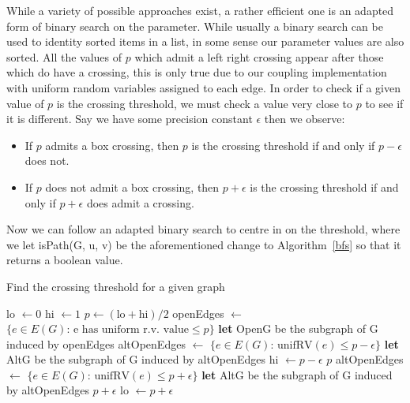 \documentclass[a4paper,11pt]{article}
\theoremstyle{definition}
\begin{document}
While a variety of possible approaches exist, a rather efficient one is an adapted form of binary search on the parameter. While usually a binary search can be used to identity sorted items in a list, in some sense our parameter values are also sorted. All the values of $p$ which admit a left right crossing appear after those which do have a crossing, this is only true due to our coupling implementation with uniform random variables assigned to each edge.
In order to check if a given value of $p$ is the crossing threshold, we must check a value very close to $p$ to see if it is different. Say we have some precision constant $\epsilon$ then we observe:
\begin{itemize}
	\item If $p$ admits a box crossing, then $p$ is the crossing threshold if and only if $p-\epsilon$ does not.
	\item If $p$ does not admit a box crossing, then $p+\epsilon$ is the crossing threshold if and only if $p+\epsilon$ does admit a crossing.
\end{itemize}

Now we can follow an adapted binary search to centre in on the threshold, where we let isPath(G, u, v) be the aforementioned change to Algorithm~\ref*{bfs} so that it returns a boolean value.

\begin{algorithm}
	\caption{Find the crossing threshold for a given graph}\label{findthreshold}
	\begin{algorithmic}[1]
	 
	\State lo $\gets 0$
	\State hi $\gets 1$
		\State $p \gets (\text{lo}+\text{hi})/2$
		\State openEdges $\gets$ $\{e \in E(G)\text{: e has uniform r.v. value}\leq p\}$
		\State \textbf{let} OpenG be the subgraph of G induced by openEdges
			\State altOpenEdges $\gets$ $\{e \in E(G)\text{: unifRV}(e)\leq p-\epsilon\}$
			\State \textbf{let} AltG be the subgraph of G induced by altOpenEdges
				\State hi $\gets p - \epsilon$
			\Else
				\State \Return $p$
			\EndIf
		\Else
			\State altOpenEdges $\gets$ $\{e \in E(G)\text{: unifRV}(e)\leq p+\epsilon\}$
			\State \textbf{let} AltG be the subgraph of G induced by altOpenEdges
				\State \Return $p +\epsilon$
			\Else
			\State lo $\gets p+\epsilon$
			\EndIf
		\EndIf
	\EndWhile
	\EndProcedure
	\end{algorithmic}
\end{algorithm}
\end{document}

